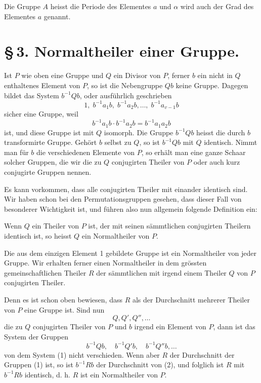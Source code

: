 \documentclass[11pt]{article}
\begin{document}
Die Gruppe $A$ heisst die Periode des Elementes $a$ und $\alpha$ wird auch der Grad des Elementes $a$ genannt.

\section*{\S\,3. Normaltheiler einer Gruppe.}

Ist $P$ wie oben eine Gruppe und $Q$ ein Divisor von $P$, ferner $b$ ein nicht in $Q$ enthaltenes Element von $P$, so ist die Nebengruppe $Qb$ keine Gruppe. Dagegen bildet das System $b^{-1}Qb$, oder ausführlich geschrieben
\[
1,\;b^{-1}a_1b,\;b^{-1}a_2b,\ldots,\;b^{-1}a_{v-1}b
\]
sicher eine Gruppe, weil
\[
b^{-1}a_1b\cdot b^{-1}a_2b=b^{-1}a_1a_2b
\]
ist, und diese Gruppe ist mit $Q$ isomorph. Die Gruppe $b^{-1}Qb$ heisst die durch $b$ transformirte Gruppe. Gehört $b$ selbst zu $Q$, so ist $b^{-1}Qb$ mit $Q$ identisch. Nimmt man für $b$ die verschiedenen Elemente von $P$, so erhält man eine ganze Schaar solcher Gruppen, die wir die zu $Q$ conjugirten Theiler von $P$ oder auch kurz conjugirte Gruppen nennen.

Es kann vorkommen, dass alle conjugirten Theiler mit einander identisch sind. Wir haben schon bei den Permutationsgruppen gesehen, dass dieser Fall von besonderer Wichtigkeit ist, und führen also nun allgemein folgende Definition ein:

Wenn $Q$ ein Theiler von $P$ ist, der mit seinen sämmtlichen conjugirten Theilern identisch ist, so heisst $Q$ ein Normaltheiler von $P$.

Die aus dem einzigen Element 1 gebildete Gruppe ist ein Normaltheiler von jeder Gruppe. Wir erhalten ferner einen Normaltheiler in dem grössten gemeinschaftlichen Theiler $R$ der sämmtlichen mit irgend einem Theiler $Q$ von $P$ conjugirten Theiler.

Denn es ist schon oben bewiesen, dass $R$ als der Durchschnitt mehrerer Theiler von $P$ eine Gruppe ist. Sind nun
\begin{equation}
Q,Q',Q'',\ldots
\tag{1}
\end{equation}
die zu $Q$ conjugirten Theiler von $P$ und $b$ irgend ein Element von $P$, dann ist das System der Gruppen
\begin{equation}
b^{-1}Qb,\quad b^{-1}Q'b,\quad b^{-1}Q''b,\ldots
\tag{2}
\end{equation}
von dem System (1) nicht verschieden. Wenn aber $R$ der Durchschnitt der Gruppen (1) ist, so ist $b^{-1}Rb$ der Durchschnitt von (2), und folglich ist $R$ mit $b^{-1}Rb$ identisch, d. h. $R$ ist ein Normaltheiler von $P$.
\end{document}
